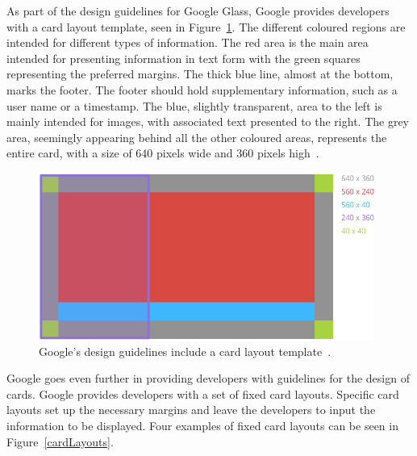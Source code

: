 As part of the design guidelines for Google Glass, Google provides developers with a card layout template, seen in Figure~\ref{GlassDesignStyle}. The different coloured regions are intended for different types of information. The red area is the main area intended for presenting information in text form with the green squares representing the preferred margins. The thick blue line, almost at the bottom, marks the footer. The footer should hold supplementary information, such as a user name or a timestamp. The blue,  slightly transparent, area to the left is mainly intended for images, with associated text presented to the right. The grey area, seemingly appearing behind all the other coloured areas, represents the entire card, with a size of 640 pixels wide and 360 pixels high~\cite{glassDesignStyle}.

	\begin{figure}[ht!]
		\centering
		\includegraphics[width=110mm]{images/standard-template}
		\caption{Google's design guidelines include a card layout template~\cite{glassDesignStyle}.}
		\label{GlassDesignStyle}
	\end{figure}

Google goes even further in providing developers with guidelines for the design of cards. Google provides developers with a set of fixed card layouts. Specific card layouts set up the necessary margins and leave the developers to input the information to be displayed. Four examples of fixed card layouts can be seen in Figure~\ref{cardLayouts}.

